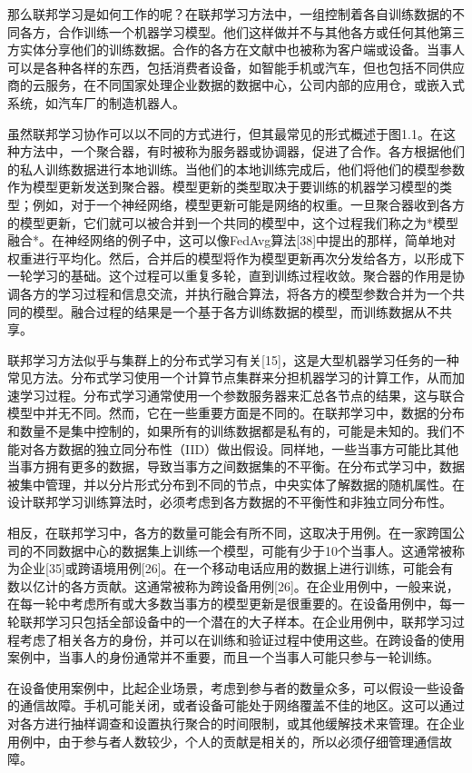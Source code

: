 那么联邦学习是如何工作的呢？在联邦学习方法中，一组控制着各自训练数据的不同各方，合作训练一个机器学习模型。他们这样做并不与其他各方或任何其他第三方实体分享他们的训练数据。合作的各方在文献中也被称为客户端或设备。当事人可以是各种各样的东西，包括消费者设备，如智能手机或汽车，但也包括不同供应商的云服务，在不同国家处理企业数据的数据中心，公司内部的应用仓，或嵌入式系统，如汽车厂的制造机器人。

虽然联邦学习协作可以以不同的方式进行，但其最常见的形式概述于图1.1。在这种方法中，一个聚合器，有时被称为服务器或协调器，促进了合作。各方根据他们的私人训练数据进行本地训练。当他们的本地训练完成后，他们将他们的模型参数作为模型更新发送到聚合器。模型更新的类型取决于要训练的机器学习模型的类型；例如，对于一个神经网络，模型更新可能是网络的权重。一旦聚合器收到各方的模型更新，它们就可以被合并到一个共同的模型中，这个过程我们称之为*模型融合*。在神经网络的例子中，这可以像FedAvg算法[38]中提出的那样，简单地对权重进行平均化。然后，合并后的模型将作为模型更新再次分发给各方，以形成下一轮学习的基础。这个过程可以重复多轮，直到训练过程收敛。聚合器的作用是协调各方的学习过程和信息交流，并执行融合算法，将各方的模型参数合并为一个共同的模型。融合过程的结果是一个基于各方训练数据的模型，而训练数据从不共享。

联邦学习方法似乎与集群上的分布式学习有关[15]，这是大型机器学习任务的一种常见方法。分布式学习使用一个计算节点集群来分担机器学习的计算工作，从而加速学习过程。分布式学习通常使用一个参数服务器来汇总各节点的结果，这与联合模型中并无不同。然而，它在一些重要方面是不同的。在联邦学习中，数据的分布和数量不是集中控制的，如果所有的训练数据都是私有的，可能是未知的。我们不能对各方数据的独立同分布性（IID）做出假设。同样地，一些当事方可能比其他当事方拥有更多的数据，导致当事方之间数据集的不平衡。在分布式学习中，数据被集中管理，并以分片形式分布到不同的节点，中央实体了解数据的随机属性。在设计联邦学习训练算法时，必须考虑到各方数据的不平衡性和非独立同分布性。

相反，在联邦学习中，各方的数量可能会有所不同，这取决于用例。在一家跨国公司的不同数据中心的数据集上训练一个模型，可能有少于10个当事人。这通常被称为企业[35]或跨语境用例[26]。在一个移动电话应用的数据上进行训练，可能会有数以亿计的各方贡献。这通常被称为跨设备用例[26]。在企业用例中，一般来说，在每一轮中考虑所有或大多数当事方的模型更新是很重要的。在设备用例中，每一轮联邦学习只包括全部设备中的一个潜在的大子样本。在企业用例中，联邦学习过程考虑了相关各方的身份，并可以在训练和验证过程中使用这些。在跨设备的使用案例中，当事人的身份通常并不重要，而且一个当事人可能只参与一轮训练。

在设备使用案例中，比起企业场景，考虑到参与者的数量众多，可以假设一些设备的通信故障。手机可能关闭，或者设备可能处于网络覆盖不佳的地区。这可以通过对各方进行抽样调查和设置执行聚合的时间限制，或其他缓解技术来管理。在企业用例中，由于参与者人数较少，个人的贡献是相关的，所以必须仔细管理通信故障。

